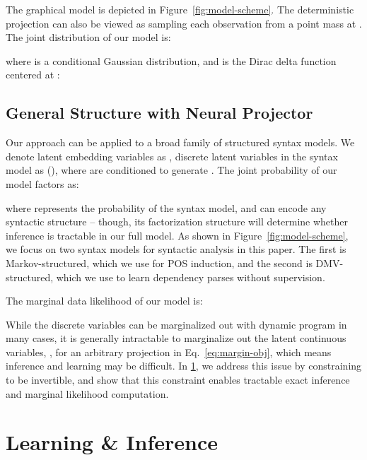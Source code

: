 \documentclass[11pt,a4paper]{article}
\begin{document}
\noindent The graphical model is depicted in Figure~\ref{fig:model-scheme}. The deterministic projection can also be viewed as sampling each observation from a point mass at .
The joint distribution of our model is:

where  is a conditional Gaussian distribution, and  is the Dirac delta function centered at :


\subsection{General Structure with Neural Projector}
\label{sec:general-neural}
Our approach can be applied to a broad family of structured syntax models. We denote latent embedding variables as , discrete latent variables in the syntax model as  (), where  are conditioned to generate . The joint probability of our model factors as:
\vspace{-1mm}

where  represents the probability of the syntax model, and can encode any syntactic structure -- though, its factorization structure will determine whether inference is tractable in our full model.
As shown in Figure~\ref{fig:model-scheme}, we focus on two syntax models for syntactic analysis in this paper. The first is Markov-structured, which we use for POS induction, and the second is DMV-structured, which we use to learn dependency parses without supervision. 

The marginal data likelihood of our model is:

While the discrete variables  can be marginalized out with dynamic program in many cases, it is generally intractable to marginalize out the latent continuous variables, , for an arbitrary projection  in Eq.~\eqref{eq:margin-obj}, which means inference and learning may be difficult.
In \cref{sec:opt}, we address this issue by constraining  to be invertible, and show that this constraint enables tractable exact inference and marginal likelihood computation.







\section{Learning \& Inference}

\label{sec:opt}
\end{document}
